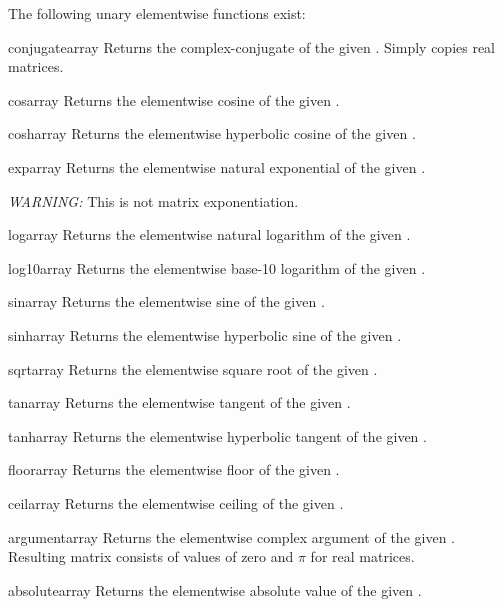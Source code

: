 The following unary elementwise functions exist:

\begin{funcdesc}{conjugate}{array}
  Returns the complex-conjugate of the given . Simply
  copies real matrices.
\end{funcdesc}
\begin{funcdesc}{cos}{array}
  Returns the elementwise cosine of the given .
\end{funcdesc}
\begin{funcdesc}{cosh}{array}
  Returns the elementwise hyperbolic cosine of the given
  .
\end{funcdesc}
\begin{funcdesc}{exp}{array}
  Returns the elementwise natural exponential of the given
  . 

  \emph{WARNING:} This is not matrix exponentiation.
\end{funcdesc}
\begin{funcdesc}{log}{array}
  Returns the elementwise natural logarithm of the given
  .
\end{funcdesc}
\begin{funcdesc}{log10}{array}
  Returns the elementwise base-10 logarithm of the given
  .
\end{funcdesc}
\begin{funcdesc}{sin}{array}
  Returns the elementwise sine of the given .
\end{funcdesc}
\begin{funcdesc}{sinh}{array}
  Returns the elementwise hyperbolic sine of the given .
\end{funcdesc}
\begin{funcdesc}{sqrt}{array}
  Returns the elementwise square root of the given .
\end{funcdesc}
\begin{funcdesc}{tan}{array}
  Returns the elementwise tangent of the given .
\end{funcdesc}
\begin{funcdesc}{tanh}{array}
  Returns the elementwise hyperbolic tangent of the given .
\end{funcdesc}
\begin{funcdesc}{floor}{array}
  Returns the elementwise floor of the given .
\end{funcdesc}
\begin{funcdesc}{ceil}{array}
  Returns the elementwise ceiling of the given .
\end{funcdesc}
\begin{funcdesc}{argument}{array}
  Returns the elementwise complex argument of the given .
  Resulting matrix consists of values of zero and $\pi$ for real matrices.
\end{funcdesc}
\begin{funcdesc}{absolute}{array}
  Returns the elementwise absolute value of the given .
\end{funcdesc}

